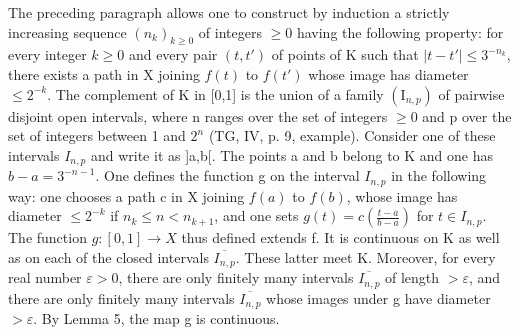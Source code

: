 The preceding paragraph allows one to construct by induction a strictly increasing sequence \((n_{k})_{k\geqslant0}\) of integers \(\geqslant0\) having the following property: for every integer \(k\geqslant0\) and every pair \((t,t')\) of points of K such that \(|t-t'| \leqslant3^{-n_{k}}\), there exists a path in X joining \(f(t)\) to \(f(t')\) whose image has diameter \(\leqslant2^{-k}\). The complement of K in {[}0,1{]} is the union of a family \((\mathrm{I}_{n,p})\) of pairwise disjoint open intervals, where n ranges over the set of integers \(\geqslant0\) and p over the set of integers between 1 and \(2^{n}\) (TG, IV, p. 9, example). Consider one of these intervals \(I_{n,p}\) and write it as {]}a,b{[}. The points a and b belong to K and one has \(b-a=3^{-n-1}\). One defines the function g on the interval \(I_{n,p}\) in the following way: one chooses a path c in X joining \(f(a)\) to \(f(b)\), whose image has diameter \(\leqslant2^{-k}\) if \(n_{k}\leqslant n<n_{k+1}\), and one sets \(g(t)=c(\frac{t-a}{b-a})\) for \(t\in I_{n,p}\). The function \(g\colon[0,1]\to X\) thus defined extends f. It is continuous on K as well as on each of the closed intervals \(\overline{I_{n,p}}\). These latter meet K. Moreover, for every real number \(\varepsilon>0\), there are only finitely many intervals \(\overline{I_{n,p}}\) of length \(>\varepsilon\), and there are only finitely many intervals \(\overline{I_{n,p}}\) whose images under g have diameter \(>\varepsilon\). By Lemma 5, the map g is continuous.
